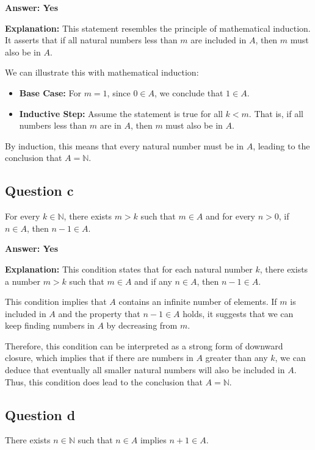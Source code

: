 \documentclass{article}
\begin{document}
\textbf{Answer: Yes}

\textbf{Explanation:} This statement resembles the principle of mathematical induction. It asserts that if all natural numbers less than \( m \) are included in \( A \), then \( m \) must also be in \( A \).

We can illustrate this with mathematical induction:

\begin{itemize}
    \item \textbf{Base Case:} For \( m = 1 \), since \( 0 \in A \), we conclude that \( 1 \in A \).
    \item \textbf{Inductive Step:} Assume the statement is true for all \( k < m \). That is, if all numbers less than \( m \) are in \( A \), then \( m \) must also be in \( A \).
\end{itemize}

By induction, this means that every natural number must be in \( A \), leading to the conclusion that \( A = \mathbb{N} \).

\subsection*{Question c}
For every \( k \in \mathbb{N} \), there exists \( m > k \) such that \( m \in A \) and for every \( n > 0 \), if \( n \in A \), then \( n - 1 \in A \).

\textbf{Answer: Yes}

\textbf{Explanation:} This condition states that for each natural number \( k \), there exists a number \( m > k \) such that \( m \in A \) and if any \( n \in A \), then \( n - 1 \in A \).

This condition implies that \( A \) contains an infinite number of elements. If \( m \) is included in \( A \) and the property that \( n - 1 \in A \) holds, it suggests that we can keep finding numbers in \( A \) by decreasing from \( m \).

Therefore, this condition can be interpreted as a strong form of downward closure, which implies that if there are numbers in \( A \) greater than any \( k \), we can deduce that eventually all smaller natural numbers will also be included in \( A \). Thus, this condition does lead to the conclusion that \( A = \mathbb{N} \).

\subsection*{Question d}
There exists \( n \in \mathbb{N} \) such that \( n \in A \) implies \( n + 1 \in A \).
\end{document}
